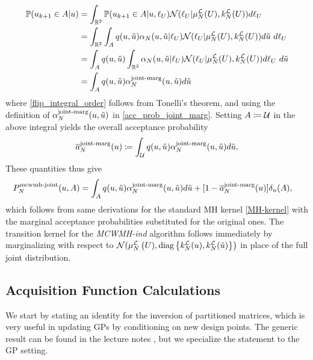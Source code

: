 \documentclass[12pt]{article}
\begin{document}
\begin{align}
\Prob(\indexMCMC[\mcmcIndex+1]{\Par} \in A | \Par)
&= \int_{\R^2} \Prob(\indexMCMC[\mcmcIndex+1]{\Par} \in A | \Par, \llikSamp_{\parMat}) \Gaussian(\llikSamp_{\parMat} | \emMean[\Ndesign]{\llik}(\parMat), \emKer[\Ndesign]{\llik}(\parMat)) d\llikSamp_{\parMat} \\
&= \int_{\R^2} \int_{A} \propDens(\Par, \propPar) \Em[\Ndesign]{\accProbMH}(\Par, \propPar | \llikSamp_{\parMat})  
\Gaussian(\llikSamp_{\parMat} | \emMean[\Ndesign]{\llik}(\parMat), \emKer[\Ndesign]{\llik}(\parMat)) d\propPar \ d\llikSamp_{\parMat} \\
&= \int_{A} \propDens(\Par, \propPar) \int_{\R^2}  \Em[\Ndesign]{\accProbMH}(\Par, \propPar | \llikSamp_{\parMat})  
\Gaussian(\llikSamp_{\parMat} | \emMean[\Ndesign]{\llik}(\parMat), \emKer[\Ndesign]{\llik}(\parMat)) d\llikSamp_{\parMat} \ d\propPar \label{flip_integral_order} \\
&= \int_{A} \propDens(\Par, \propPar) \llikEmJointMarg[\Ndesign]{\accProbMH}(\Par, \propPar)  d\propPar
\end{align}
where \ref{flip_integral_order} follows from Tonelli's theorem, and using the definition of $\llikEmJointMarg[\Ndesign]{\accProbMH}(\Par, \propPar)$
in \ref{acc_prob_joint_marg}. Setting $A \Def \parSpace$ in the above integral yields the overall acceptance probability 
\begin{align}
\llikEmJointMarg[\Ndesign]{\avgAccProbMH}(\Par) \Def \int_{\parSpace} \propDens(\Par, \propPar) \llikEmJointMarg[\Ndesign]{\accProbMH}(\Par, \propPar)  d\propPar. 
\end{align}
These quantities thus give 
\begin{align}
\llikEmJointMCWMH[\Ndesign]{\MarkovKernel}(\Par, A)
&= \int_{A} \propDens(\Par, \propPar) \llikEmJointMarg[\Ndesign]{\accProbMH}(\Par, \propPar) d\propPar
+ [1 - \llikEmJointMarg[\Ndesign]{\avgAccProbMH}(\Par)] \delta_{\Par}(A) \label{MH-kernel}, 
\end{align}
which follows from same derivations for the standard MH kernel \ref{MH-kernel} with the marginal acceptance probabilities substituted for
the original ones. The transition kernel for the \textit{MCWMH-ind} algorithm follows immediately by marginalizing with respect 
to $\Gaussian(\emMean[\Ndesign]{\llik}\left(\parMat), \text{diag}\left\{\emKer[\Ndesign]{\llik}(\Par), \emKer[\Ndesign]{\llik}(\propPar) \right\}\right)$
in place of the full joint distribution. 

\subsection{Acquisition Function Calculations}
We start by stating an identity for the inversion of partitioned matrices, which is very useful in updating GPs by 
conditioning on new design points. The generic result can be found in the lecture notes \cite{MinkaMatrixLectures}, 
but we specialize the statement to the GP setting.  
\end{document}
